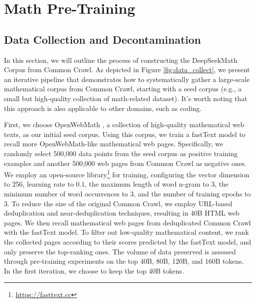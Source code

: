 \section{Math Pre-Training}

\subsection{Data Collection and Decontamination} In this section, we will outline the process of constructing the DeepSeekMath Corpus from Common Crawl. As depicted in Figure \ref{fig:data_collect}, we present an iterative pipeline that demonstrates how to systematically gather a large-scale mathematical corpus from Common Crawl, starting with a seed corpus (e.g., a small but high-quality collection of math-related dataset). It's worth noting that this approach is also applicable to other domains, such as coding.

First, we choose OpenWebMath \citep{openwebmath}, a collection of high-quality mathematical web texts, as our initial seed corpus. Using this corpus, we train a fastText model \citep{joulin2016fasttext} to recall more OpenWebMath-like mathematical web pages. Specifically, we randomly select 500,000 data points from the seed corpus as positive training examples and another 500,000 web pages from Common Crawl as negative ones. We employ an open-source library\footnote{\url{https://fasttext.cc}} for training, configuring the vector dimension to 256, learning rate to 0.1, the maximum length of word n-gram to 3, the minimum number of word occurrences to 3, and the number of training epochs to 3. To reduce the size of the original Common Crawl, we employ URL-based deduplication and near-deduplication techniques, resulting in 40B HTML web pages. We then recall mathematical web pages from deduplicated Common Crawl with the fastText model. To filter out low-quality mathematical content, we rank the collected pages according to their scores predicted by the fastText model, and only preserve the top-ranking ones. The volume of data preserved is assessed through pre-training experiments on the top 40B, 80B, 120B, and 160B tokens. In the first iteration, we choose to keep the top 40B tokens.

